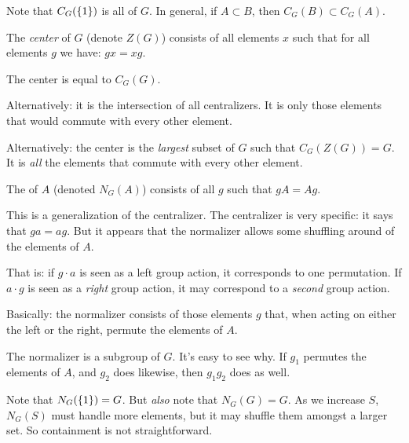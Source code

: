 \begin{remark}
  Note that $C_G(\left\{ 1 \right\})$ is all of $G$. In general, if $A \subset
  B$, then $C_G(B) \subset C_G(A)$.
\end{remark}

\begin{definition}
  The \emph{center} of $G$ (denote $Z(G)$) consists of all elements $x$
  such that for all elements $g$ we have: $gx = xg$.

  The center is equal to $C_G(G)$.

  Alternatively: it is the intersection of all centralizers. It is only
  those elements that would commute with every other element.

  Alternatively: the center is the \emph{largest} subset of $G$ such
  that $C_G(Z(G)) = G$. It is \emph{all} the elements that commute with
  every other element.
\end{definition}

\begin{definition}
  The  of $A$ (denoted $N_G(A)$) consists of all $g$
  such that $gA = Ag$.
\end{definition}

\begin{remark}
  This is a generalization of the centralizer. The centralizer is very
  specific: it says that $ga = ag$. But it appears that the normalizer
  allows some shuffling around of the elements of $A$.

  That is: if $g \cdot a$ is seen as a left group action, it corresponds
  to one permutation. If $a \cdot g$ is seen as a \emph{right} group
  action, it may correspond to a \emph{second} group action.

  Basically: the normalizer consists of those elements $g$ that, when
  acting on either the left or the right, permute the elements of $A$.
\end{remark}

\begin{remark}
  The normalizer is a subgroup of $G$. It's easy to see why. If $g_1$
  permutes the elements of $A$, and $g_2$ does likewise, then $g_1 g_2$
  does as well.
\end{remark}

\begin{remark}
  Note that $N_G(\left\{ 1 \right\}) = G$. But \emph{also} note that $N_G(G) =
  G$. As we increase $S$, $N_G(S)$ must handle more elements, but it may
  shuffle them amongst a larger set. So containment is not
  straightforward.
\end{remark}

